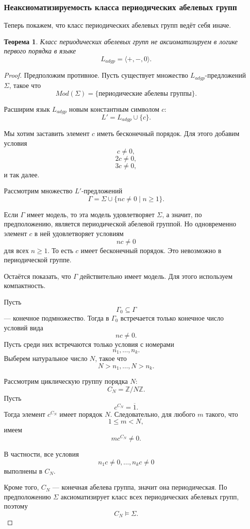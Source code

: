 \documentclass[12pt,a4paper,oneside,openany]{book}
\theoremstyle{definition}
\theoremstyle{plain}
\newtheorem{theorem}{Теорема}[chapter]
\theoremstyle{remark}
\begin{document}
\subsubsection{Неаксиоматизируемость класса периодических абелевых групп}

Теперь покажем, что класс периодических абелевых групп ведёт себя иначе.

\begin{theorem}
Класс периодических абелевых групп не аксиоматизируем в логике первого порядка в языке
\[
L_{adgp}=\langle +,-,0\rangle.
\]
\end{theorem}

\begin{proof}
Предположим противное. Пусть существует множество \(L_{adgp}\)-предложений \(\Sigma\), такое что
\[
Mod(\Sigma)
=
\{\text{периодические абелевы группы}\}.
\]

Расширим язык \(L_{adgp}\) новым константным символом \(c\):
\[
L'=L_{adgp}\cup\{c\}.
\]

Мы хотим заставить элемент \(c\) иметь бесконечный порядок. Для этого добавим условия
\[
c\ne 0,
\]
\[
2c\ne 0,
\]
\[
3c\ne 0,
\]
и так далее.

Рассмотрим множество \(L'\)-предложений
\[
\Gamma
=
\Sigma
\cup
\{nc\ne 0\mid n\ge 1\}.
\]

Если \(\Gamma\) имеет модель, то эта модель удовлетворяет \(\Sigma\), а значит, по предположению, является периодической абелевой группой. Но одновременно элемент \(c\) в ней удовлетворяет условиям
\[
nc\ne 0
\]
для всех \(n\ge 1\). То есть \(c\) имеет бесконечный порядок. Это невозможно в периодической группе.

Остаётся показать, что \(\Gamma\) действительно имеет модель. Для этого используем компактность.

Пусть
\[
\Gamma_0\subseteq \Gamma
\]
— конечное подмножество. Тогда в \(\Gamma_0\) встречается только конечное число условий вида
\[
nc\ne 0.
\]
Пусть среди них встречаются только условия с номерами
\[
n_1,\ldots,n_k.
\]
Выберем натуральное число \(N\), такое что
\[
N>n_1,\ldots,N>n_k.
\]

Рассмотрим циклическую группу порядка \(N\):
\[
C_N=\mathbb Z/N\mathbb Z.
\]
Пусть
\[
c^{C_N}=\overline{1}.
\]
Тогда элемент \(c^{C_N}\) имеет порядок \(N\). Следовательно, для любого \(m\) такого, что
\[
1\le m<N,
\]
имеем
\[
m c^{C_N}\ne 0.
\]

В частности, все условия
\[
n_1c\ne 0,\ldots,n_kc\ne 0
\]
выполнены в \(C_N\).

Кроме того, \(C_N\) — конечная абелева группа, значит она периодическая. По предположению \(\Sigma\) аксиоматизирует класс всех периодических абелевых групп, поэтому
\[
C_N\models\Sigma.
\]


\end{proof}
\end{document}
